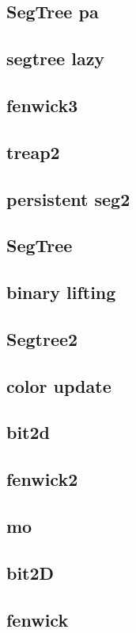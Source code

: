 \subsection{SegTree pa}
\raggedbottom
\hrulefill
\subsection{segtree lazy}
\raggedbottom
\hrulefill
\subsection{fenwick3}
\raggedbottom
\hrulefill
\subsection{treap2}
\raggedbottom
\hrulefill
\subsection{persistent seg2}
\raggedbottom
\hrulefill
\subsection{SegTree}
\raggedbottom
\hrulefill
\subsection{binary lifting}
\raggedbottom
\hrulefill
\subsection{Segtree2}
\raggedbottom
\hrulefill
\subsection{color update}
\raggedbottom
\hrulefill
\subsection{bit2d}
\raggedbottom
\hrulefill
\subsection{fenwick2}
\raggedbottom
\hrulefill
\subsection{mo}
\raggedbottom
\hrulefill
\subsection{bit2D}
\raggedbottom
\hrulefill
\subsection{fenwick}
\raggedbottom
\hrulefill

